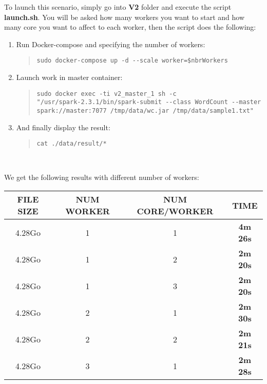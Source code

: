 \documentclass{article}
\begin{document}
\noindent To launch this scenario, simply go into \textbf{V2} folder and execute the script \textbf{launch.sh}. You will be asked how many workers you want to start and how many core you want to affect to each worker, then the script does the following:
\begin{enumerate}
    \item Run Docker-compose and specifying the number of workers:
    \begin{quote}
\begin{verbatim}
sudo docker-compose up -d --scale worker=$nbrWorkers
\end{verbatim}
    \end{quote}
    
    \item Launch work in master container:
    \begin{quote}
\begin{verbatim}
sudo docker exec -ti v2_master_1 sh -c 
"/usr/spark-2.3.1/bin/spark-submit --class WordCount --master 
spark://master:7077 /tmp/data/wc.jar /tmp/data/sample1.txt"
\end{verbatim}
    \end{quote}
    
    \item And finally display the result:
    \begin{quote}
\begin{verbatim}
cat ./data/result/*
\end{verbatim}
    \end{quote}
\end{enumerate}
\ \

\noindent We get the following results with different number of workers: \\
\begin{center}
    \begin{tabular}{||c c c c||} 
    \hline
    FILE SIZE & NUM WORKER & NUM CORE/WORKER & TIME \\ [0.5ex] 
    \hline\hline
    4.28Go & 1 & 1 & \textbf{4m 26s} \\ 
    \hline
    4.28Go & 1 & 2 & \textbf{2m 20s} \\ 
    \hline
    4.28Go & 1 & 3 & \textbf{2m 20s} \\ 
    \hline
    4.28Go & 2 & 1 & \textbf{2m 30s} \\ 
    \hline
    4.28Go & 2 & 2 & \textbf{2m 21s} \\ 
    \hline
    4.28Go & 3 & 1 & \textbf{2m 28s} \\ 
    \hline
    \end{tabular}
\end{center}
\vspace*{0.2cm}
\end{document}
